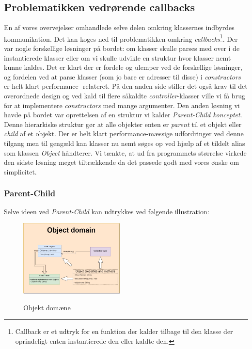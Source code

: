 \documentclass[]{article}
\begin{document}
	\subsection{Problematikken vedrørende callbacks}
	En af vores overvejelser omhandlede selve delen omkring klassernes indbyrdes kommunikation. Det kan koges ned til problematikken omkring \textit{callbacks}\footnote{Callback er et udtryk for en funktion der kalder tilbage til den klasse der oprindeligt enten instantierede den eller kaldte den.}. Der var nogle forskellige løsninger på bordet: om klasser skulle parses med over i de instantierede klasser eller om vi skulle udvikle en struktur hvor klasser nemt kunne kaldes. Det er klart der er fordele og ulemper ved de forskellige løsninger, og fordelen ved at parse klasser (som jo bare er adresser til disse) i \textit{constructors} er helt klart performance- relateret. På den anden side stiller det også krav til det overordnede design og ved kald til flere såkaldte \textit{controller}-klasser ville vi få brug for at implementere \textit{constructors} med mange argumenter. Den anden løsning vi havde på bordet var oprettelsen af en struktur vi kalder \textit{Parent-Child konceptet}. Denne hierarkiske struktur gør at alle objekter enten er \textit{parent} til et objekt eller \textit{child} af et objekt. Der er helt klart performance-mæssige udfordringer ved denne tilgang men til gengæld kan klasser nu nemt søges op ved hjælp af et tildelt alias som klassen \textit{Object} håndterer. Vi tænkte, at ud fra programmets størrelse virkede den sidste løsning meget tiltrækkende da det passede godt med vores ønske om simplicitet. 
	
	\pagebreak
	\subsubsection{Parent-Child}
	
	Selve ideen ved \textit{Parent-Child} kan udtrykkes ved følgende illustration:
	
	\begin{figure}[h!]
		
		\centering
		\includegraphics[width=200px]{Object_hierarchy.jpg}
		\label{fig:hierarchy}
		\caption{Objekt domæne}
	\end{figure}
	
\end{document}
